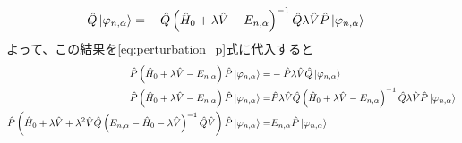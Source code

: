 \documentclass{ltjsarticle}
\begin{document}
\begin{align}
  \hat{Q}\ket*{\varphi_{n,\alpha}}=&-\hat{Q}\left( \hat{H}_0+\lambda \hat{V}-E_{n,\alpha} \right)^{-1}\hat{Q}\lambda\hat{V}\hat{P}\ket*{\varphi_{n,\alpha}}
  \label{eq:perturbation_q}
\end{align}
よって、この結果を\eqref{eq:perturbation_p}式に代入すると
\begin{align}
  \hat{P}\left( \hat{H}_0+\lambda\hat{V}-E_{n,\alpha} \right)\hat{P}\ket*{\varphi_{n,\alpha}}=&-\hat{P}\lambda\hat{V}\hat{Q}\ket*{\varphi_{n,\alpha}}\\
  \hat{P}\left( \hat{H}_0+\lambda\hat{V}-E_{n,\alpha} \right)\hat{P}\ket*{\varphi_{n,\alpha}}=&\hat{P}\lambda\hat{V}\hat{Q}\left( \hat{H}_0+\lambda \hat{V}-E_{n,\alpha} \right)^{-1}\hat{Q}\lambda\hat{V}\hat{P}\ket*{\varphi_{n,\alpha}}\\
  \hat{P}\left( \hat{H}_0+\lambda\hat{V}+\lambda^2\hat{V}\hat{Q}\left( E_{n,\alpha}-\hat{H}_0-\lambda \hat{V} \right)^{-1}\hat{Q}\hat{V} \right)\hat{P}\ket*{\varphi_{n,\alpha}}=&E_{n,\alpha}\hat{P}\ket*{\varphi_{n,\alpha}}
  \label{eq:perturbation_result}
\end{align}
\end{document}
